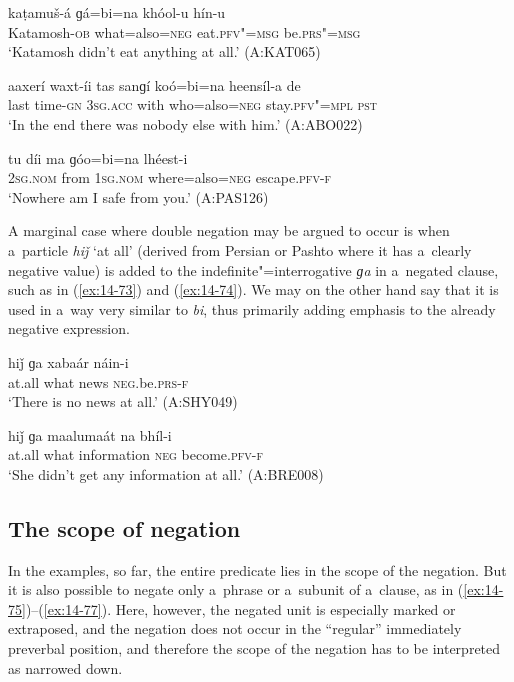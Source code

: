 \begin{exe}
\ex
\label{ex:14-70}
\gll kaṭamuš-á ɡá=bi=na khóol-u hín-u \\
Katamosh-\textsc{ob} what=also=\textsc{neg} eat.\textsc{pfv"=msg } be.\textsc{prs"=msg} \\
\glt `Katamosh didn't eat anything at all.' (A:KAT065)

\ex
\label{ex:14-71}
\gll aaxerí waxt-íi tas sanɡí koó=bi=na heensíl-a  de \\
last time-\textsc{gn} \textsc{3sg.acc} with who=also=\textsc{neg} stay.\textsc{pfv"=mpl}  \textsc{pst} \\
\glt `In the end there was nobody else with him.' (A:ABO022)

\ex
\label{ex:14-72}
\gll tu díi ma ɡóo=bi=na lhéest-i \\
\textsc{2sg.nom} from \textsc{1sg.nom} where=also=\textsc{neg} escape.\textsc{pfv-f}  \\
\glt `Nowhere am I safe from you.' (A:PAS126)
\end{exe}

A marginal case where double negation may be argued to occur is when a~particle \textit{hiǰ} `at all' (derived from Persian or Pashto where it has a~clearly negative value) is added to the indefinite"=interrogative \textit{ɡa} in a~negated clause, such as in (\ref{ex:14-73}) and (\ref{ex:14-74}). We may on the other hand say that it is used in a~way very similar to \textit{bi}, thus primarily adding emphasis to the already negative expression.

\begin{exe}
\ex
\label{ex:14-73}
\gll hiǰ ɡa xabaár náin-i \\
at.all what news \textsc{neg}.be.\textsc{prs-f}  \\
\glt `There is no news at all.' (A:SHY049)

\ex
\label{ex:14-74}
\gll hiǰ ɡa maalumaát na bhíl-i \\
at.all what information \textsc{neg} become.\textsc{pfv-f } \\
\glt `She didn't get any information at all.' (A:BRE008)
\end{exe}

\subsection{The scope of negation}
\label{subsec:14-3-3}


 In the examples, so far, the entire predicate lies in the scope of the negation. But it is also possible to negate only a~phrase or a~subunit of a~clause, as in (\ref{ex:14-75})--(\ref{ex:14-77}). Here, however, the negated unit is especially marked or extraposed, and the negation does not occur in the ``regular'' immediately preverbal position, and therefore the scope of the negation has to be interpreted as narrowed down. 

